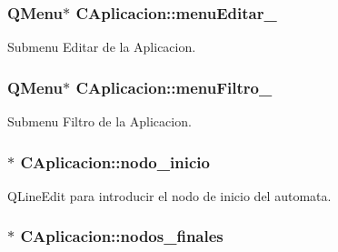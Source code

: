 \subsubsection[{\texorpdfstring{menu\+Editar\+\_\+}{menuEditar_}}]{\setlength{\rightskip}{0pt plus 5cm}Q\+Menu$\ast$ C\+Aplicacion\+::menu\+Editar\+\_\+\hspace{0.3cm}{\ttfamily [private]}}\hypertarget{classCAplicacion_a9753ee6650d3a8922650b09b70fe15b9}{}\label{classCAplicacion_a9753ee6650d3a8922650b09b70fe15b9}


Submenu Editar de la Aplicacion. 

\subsubsection[{\texorpdfstring{menu\+Filtro\+\_\+}{menuFiltro_}}]{\setlength{\rightskip}{0pt plus 5cm}Q\+Menu$\ast$ C\+Aplicacion\+::menu\+Filtro\+\_\+\hspace{0.3cm}{\ttfamily [private]}}\hypertarget{classCAplicacion_af9dedeec60356a055cb899e5f8a447b8}{}\label{classCAplicacion_af9dedeec60356a055cb899e5f8a447b8}


Submenu Filtro de la Aplicacion. 

\subsubsection[{\texorpdfstring{nodo\+\_\+inicio}{nodo_inicio}}]{$\ast$ C\+Aplicacion\+::nodo\+\_\+inicio\hspace{0.3cm}{\ttfamily [private]}}\hypertarget{classCAplicacion_a9d3e345fc25efeaf8a160daf22206a8e}{}\label{classCAplicacion_a9d3e345fc25efeaf8a160daf22206a8e}


Q\+Line\+Edit para introducir el nodo de inicio del automata. 

\subsubsection[{\texorpdfstring{nodos\+\_\+finales}{nodos_finales}}]{$\ast$ C\+Aplicacion\+::nodos\+\_\+finales\hspace{0.3cm}{\ttfamily [private]}}\hypertarget{classCAplicacion_a483026f954a5a26ddd9ded5863c61b9a}{}\label{classCAplicacion_a483026f954a5a26ddd9ded5863c61b9a}


